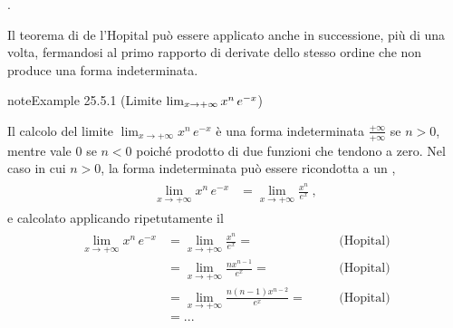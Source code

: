 \documentclass[letterpaper,10pt,italian]{jupyterBook}
\begin{document}
\sphinxAtStartPar
{\hyperref[\detokenize{ch/infinitesimal_calculus/derivatives-notes:infinitesimal-calculus-derivatives-thm-hopital-notes}]{}}.

\sphinxAtStartPar
{} Il teorema di de l’Hopital può essere applicato anche in successione, più di una volta, fermandosi al primo rapporto di derivate dello stesso ordine che non produce una forma indeterminata.
\label{ch/infinitesimal_calculus/derivatives:limit:example:lim-xne-x}
\begin{sphinxadmonition}{note}{Example 25.5.1 (Limite \protect\(\lim_{x \rightarrow +\infty} x^n \, e^{-x}\protect\))}



\sphinxAtStartPar
Il calcolo del limite \(\lim_{x \rightarrow +\infty} x^n \, e^{-x}\) è una forma indeterminata \(\frac{+\infty}{+\infty}\) se \(n > 0\), mentre vale \(0\) se \(n < 0\) poiché prodotto di due funzioni che tendono a zero. Nel caso in cui \(n>0\), la forma indeterminata può essere ricondotta a un {\hyperref[\detokenize{ch/infinitesimal_calculus/analysis:infinitesimal-calculus-limits-infinite-simal}]{}},
\begin{equation*}
\begin{split}\begin{aligned}
  \lim_{x \rightarrow +\infty} x^n \, e^{-x}
  & = \lim_{x \rightarrow +\infty} \frac{x^n}{e^x} \ , 
\end{aligned}\end{split}
\end{equation*}
\sphinxAtStartPar
e calcolato applicando ripetutamente il {\hyperref[\detokenize{ch/infinitesimal_calculus/derivatives:infinitesimal-calculus-derivatives-thm-hopital}]{}}
\begin{equation*}
\begin{split}\begin{aligned}
  \lim_{x \rightarrow +\infty} x^n \, e^{-x}
  & = \lim_{x \rightarrow +\infty} \frac{x^n}{e^x} = && \quad \text{(Hopital)} \\
  & = \lim_{x \rightarrow +\infty} \frac{n x^{n-1}}{e^x} = && \quad \text{(Hopital)} \\
  & = \lim_{x \rightarrow +\infty} \frac{n (n-1) x^{n-2}}{e^x} = && \quad \text{(Hopital)} \\
  & = ... \\
\end{aligned}\end{split}

\end{equation*}
\end{sphinxadmonition}
\end{document}
